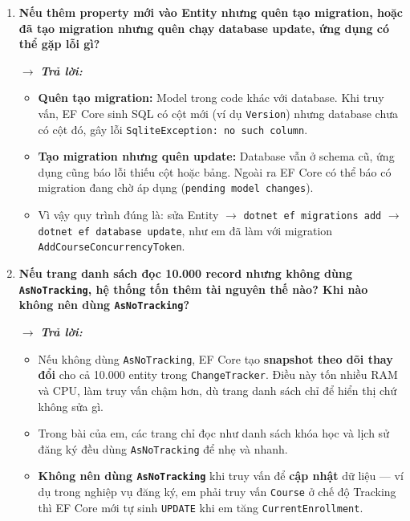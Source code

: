 \begin{enumerate}[label = \arabic*.]
    \item \textbf{Nếu thêm property mới vào Entity nhưng quên tạo migration, hoặc đã tạo migration nhưng quên chạy database update, ứng dụng có thể gặp lỗi gì?}

    $\rightarrow$ \textbf{\textit{Trả lời:}}
    \begin{itemize}[leftmargin = 0.6cm, label = -]
        \item \textbf{Quên tạo migration:} Model trong code khác với database. Khi truy vấn, EF Core sinh SQL có cột mới (ví dụ \texttt{Version}) nhưng database chưa có cột đó, gây lỗi \texttt{SqliteException: no such column}.

        \item \textbf{Tạo migration nhưng quên update:} Database vẫn ở schema cũ, ứng dụng cũng báo lỗi thiếu cột hoặc bảng. Ngoài ra EF Core có thể báo có migration đang chờ áp dụng (\texttt{pending model changes}).

        \item Vì vậy quy trình đúng là: sửa Entity $\rightarrow$ \texttt{dotnet ef migrations add} $\rightarrow$ \texttt{dotnet ef database update}, như em đã làm với migration \texttt{AddCourseConcurrencyToken}.
    \end{itemize}

    \item \textbf{Nếu trang danh sách đọc 10.000 record nhưng không dùng \texttt{AsNoTracking}, hệ thống tốn thêm tài nguyên thế nào? Khi nào không nên dùng \texttt{AsNoTracking}?}

    $\rightarrow$ \textbf{\textit{Trả lời:}}
    \begin{itemize}[leftmargin = 0.6cm, label = -]
        \item Nếu không dùng \texttt{AsNoTracking}, EF Core tạo \textbf{snapshot theo dõi thay đổi} cho cả 10.000 entity trong \texttt{ChangeTracker}. Điều này tốn nhiều RAM và CPU, làm truy vấn chậm hơn, dù trang danh sách chỉ để hiển thị chứ không sửa gì.

        \item Trong bài của em, các trang chỉ đọc như danh sách khóa học và lịch sử đăng ký đều dùng \texttt{AsNoTracking} để nhẹ và nhanh.

        \item \textbf{Không nên dùng \texttt{AsNoTracking}} khi truy vấn để \textbf{cập nhật} dữ liệu --- ví dụ trong nghiệp vụ đăng ký, em phải truy vấn \texttt{Course} ở chế độ Tracking thì EF Core mới tự sinh \texttt{UPDATE} khi em tăng \texttt{CurrentEnrollment}.
    \end{itemize}


\end{enumerate}
